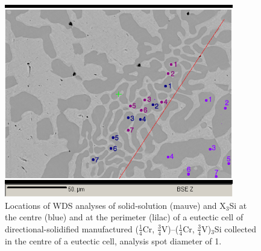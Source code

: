 %
%
%
%
%
%
\begin{figure}[H]
\begin{center}
\includegraphics[width=10cm]{grid08neighbourssX3Si}
\caption{Locations of WDS analyses of solid-solution (mauve) and X$_3$Si at the centre (blue) and at the perimeter (lilac) of a eutectic cell of directional-solidified manufactured ($\frac{1}{4}$Cr, $\frac{3}{4}$V)--($\frac{1}{4}$Cr, $\frac{3}{4}$V)$_3$Si collected in the centre of a eutectic cell, analysis spot diameter of 1\micro\metre.}
\label{fig:grid08neighbourssX3Si}
\end{center}
\end{figure}
